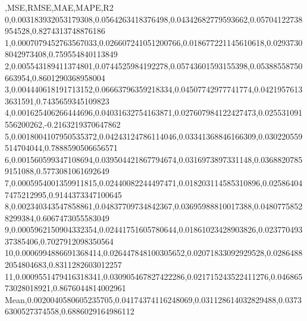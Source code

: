 ,MSE,RMSE,MAE,MAPE,R2
0,0.003183932053179308,0.0564263418376498,0.04342682779593662,0.05704122738954528,0.8274313748876186
1,0.0007079452763567033,0.026607241051200766,0.018677221145610618,0.02937308042973408,0.759554840113849
2,0.005543189411374801,0.0744525984192278,0.05743601593155398,0.05388558750663954,0.8601290368958004
3,0.004440618191713152,0.06663796359218334,0.04507742977741774,0.04219576133631591,0.7435659345109823
4,0.001625406266444696,0.04031632754163871,0.027607984122427473,0.025531091556200262,-0.2163219370647862
5,0.0018004107950535372,0.04243124786114046,0.03341368846166309,0.030220559514704044,0.7888590506656571
6,0.001560599347108694,0.039504421867794674,0.0316973897331148,0.03688207859151088,0.5773081061692649
7,0.0005954001359911815,0.02440082244497471,0.018203114585310896,0.025864047475212995,0.9144373347100645
8,0.002340343547858861,0.04837709734842367,0.03695988810017388,0.04807758528299384,0.6067473055583049
9,0.0005962150904332354,0.02441751605780644,0.01861023428903826,0.02377049337385406,0.7027912098350564
10,0.0006994886691368414,0.026447848100305652,0.02071833092929528,0.02864882054804683,0.8311282603012257
11,0.0009551479416318341,0.030905467827422286,0.021715243522411276,0.04686573028018921,0.8676044814002961
Mean,0.0020040580605235705,0.04174374116248069,0.031128614032829488,0.03736300527374558,0.6886029164986112
